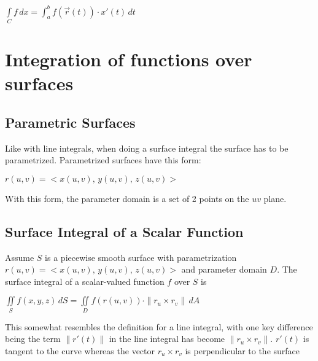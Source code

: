 \documentclass[12pt, letterpaper]{article}
\begin{document}
  \begin{center}
    \(\int \limits_C f \, dx = \int_{a}^{b}f(\vec{r}(t)) \cdot x'(t)\,dt\) \\
  \end{center}

\pagebreak

\section*{Integration of functions over surfaces}

  \subsection*{Parametric Surfaces}
  Like with line integrals, when doing a surface integral the surface has to be parametrized. 
  Parametrized surfaces have this form:

  \begin{center}
    \(r(u, v) = <x(u, v),\,y(u,v),\,z(u, v)>\)
  \end{center}

  \noindent With this form, the parameter domain is a set of 2 points on the \(uv\) plane.

  \subsection*{Surface Integral of a Scalar Function}

  Assume \(S\) is a piecewise smooth surface with parametrization \(r(u, v) = <x(u, v),\,y(u,v),\,z(u,v)>\) and parameter domain \(D\). 
  The surface integral of a scalar-valued function \(f\) over \(S\) is 
  \begin{center}
    \(\iint \limits_S f(x,y,z)\,dS = \iint \limits_D f(r(u,v)) \cdot \|r_{u} \times r_{v{}}\|\,dA\)
  \end{center}
  
  \noindent This somewhat resembles the definition for a line integral, with one key difference being the term \(\|r'(t)\|\) in the line integral has become \(\|r_{u}\times r_{v}\|\). \(r'(t)\) is tangent to the curve whereas the vector \(r_{u} \times r_{v}\) is perpendicular to the surface
\end{document}
